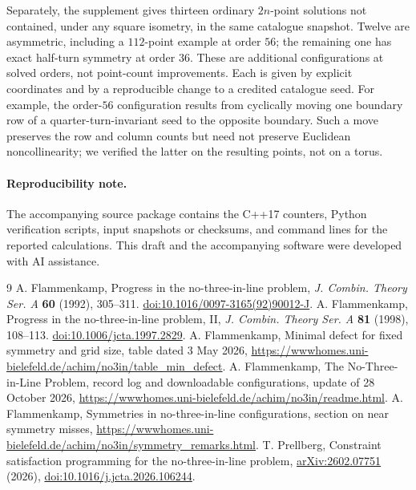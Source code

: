 \documentclass[11pt]{article}
\begin{document}
Separately, the supplement gives thirteen ordinary $2n$-point solutions not contained, under any square isometry, in the same catalogue snapshot. Twelve are asymmetric, including a $112$-point example at order $56$; the remaining one has exact half-turn symmetry at order $36$. These are additional configurations at solved orders, not point-count improvements. Each is given by explicit coordinates and by a reproducible change to a credited catalogue seed. For example, the order-$56$ configuration results from cyclically moving one boundary row of a quarter-turn-invariant seed to the opposite boundary. Such a move preserves the row and column counts but need not preserve Euclidean noncollinearity; we verified the latter on the resulting points, not on a torus.

\paragraph{Reproducibility note.} The accompanying source package contains the C++17 counters, Python verification scripts, input snapshots or checksums, and command lines for the reported calculations. This draft and the accompanying software were developed with AI assistance.

\begin{thebibliography}{9}\small
{} A. Flammenkamp, Progress in the no-three-in-line problem, \emph{J. Combin. Theory Ser. A} \textbf{60} (1992), 305--311. \href{https://doi.org/10.1016/0097-3165(92)90012-J}{doi:10.1016/0097-3165(92)90012-J}.
 A. Flammenkamp, Progress in the no-three-in-line problem, II, \emph{J. Combin. Theory Ser. A} \textbf{81} (1998), 108--113. \href{https://doi.org/10.1006/jcta.1997.2829}{doi:10.1006/jcta.1997.2829}.
 A. Flammenkamp, Minimal defect for fixed symmetry and grid size, table dated 3 May 2026, \url{https://wwwhomes.uni-bielefeld.de/achim/no3in/table_min_defect}.
 A. Flammenkamp, The No-Three-in-Line Problem, record log and downloadable configurations, update of 28 October 2026, \url{https://wwwhomes.uni-bielefeld.de/achim/no3in/readme.html}.
 A. Flammenkamp, Symmetries in no-three-in-line configurations, section on near symmetry misses, \url{https://wwwhomes.uni-bielefeld.de/achim/no3in/symmetry_remarks.html}.
 T. Prellberg, Constraint satisfaction programming for the no-three-in-line problem, \href{https://arxiv.org/abs/2602.07751}{arXiv:2602.07751} (2026), \href{https://doi.org/10.1016/j.jcta.2026.106244}{doi:10.1016/j.jcta.2026.106244}.
\end{thebibliography}
\end{document}
